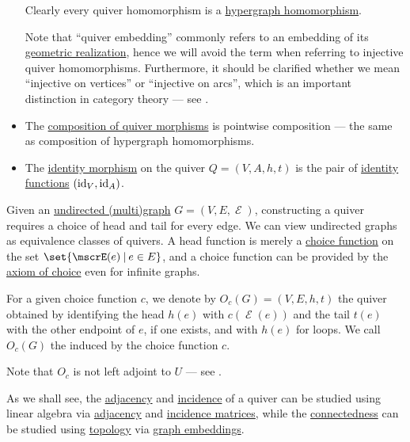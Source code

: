 \begin{definition}
\begin{itemize}
    Clearly every quiver homomorphism is a \hyperref[eq:def:category_of_small_hypergraphs/homomorphism]{hypergraph homomorphism}.

    Note that \enquote{quiver embedding} commonly refers to an embedding of its \hyperref[def:quiver_geometric_realization/undirected]{geometric realization}, hence we will avoid the term when referring to injective quiver homomorphisms. Furthermore, it should be clarified whether we mean \enquote{injective on vertices} or \enquote{injective on arcs}, which is an important distinction in category theory --- see .

    \item The \hyperref[def:category/composition]{composition of quiver morphisms} is pointwise composition --- the same as composition of hypergraph homomorphisms.

    \item The \hyperref[def:category/identity]{identity morphism} on the quiver \( Q = (V, A, h, t) \) is the pair of \hyperref[def:multi_valued_function/identity]{identity functions} \( (\operatorname{id}_V, \operatorname{id}_A) \).
  \end{itemize}
\end{definition}

\begin{definition}\label{def:multigraph_orientation}
  Given an \hyperref[def:undirected_multigraph]{undirected (multi)graph} \( G = (V, E, \mscrE) \), constructing a quiver requires a choice of head and tail for every edge. We can view undirected graphs as equivalence classes of quivers. A head function is merely a \hyperref[def:choice_function]{choice function} on the set \( \set{ \mscrE(e) \given e \in E } \), and a choice function can be provided by the \hyperref[def:zfc/choice]{axiom of choice} even for infinite graphs.

  For a given choice function \( c \), we denote by \( O_c(G) = (V, E, h, t) \) the quiver obtained by identifying the head \( h(e) \) with \( c(\mscrE(e)) \) and the tail \( t(e) \) with the other endpoint of \( e \), if one exists, and with \( h(e) \) for loops. We call \( O_c(G) \) the  induced by the choice function \( c \).

  Note that \( O_c \) is not left adjoint to \( U \) --- see .
\end{definition}

\begin{remark}\label{rem:graphs_linear_algebra_and_topology}
  As we shall see, the \hyperref[def:hypergraph/adjacency]{adjacency} and \hyperref[def:hypergraph/incidence]{incidence} of a quiver can be studied using linear algebra via \hyperref[def:graph_adjacency_matrix]{adjacency} and \hyperref[def:hypergraph_incidence_matrix]{incidence matrices}, while the \hyperref[def:quiver_connectedness]{connectedness} can be studied using \hyperref[def:quiver_connectedness]{topology} via \hyperref[def:quiver_geometric_realization/embedding]{graph embeddings}.
\end{remark}

